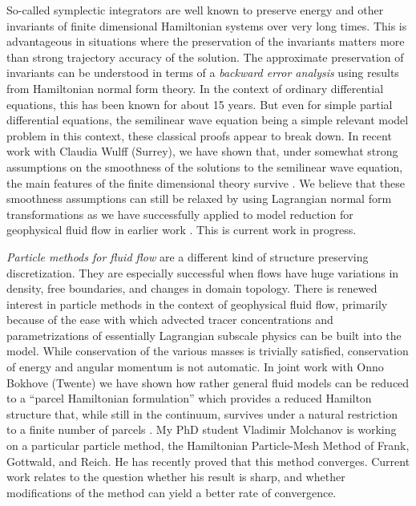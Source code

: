 So-called symplectic integrators are well known to preserve energy and
other invariants of finite dimensional Hamiltonian systems over very
long times.  This is advantageous in situations where the preservation
of the invariants matters more than strong trajectory accuracy of the
solution.  The approximate preservation of invariants can be
understood in terms of a \emph{backward error analysis} using results
from Hamiltonian normal form theory.  In the context of ordinary
differential equations, this has been known for about 15 years.  But
even for simple partial differential equations, the semilinear wave
equation being a simple relevant model problem in this context, these
classical proofs appear to break down.  In recent work with Claudia
Wulff (Surrey), we have shown that, under somewhat strong assumptions
on the smoothness of the solutions to the semilinear wave equation,
the main features of the finite dimensional theory survive
\cite{OliverWulff}.  We believe that these smoothness assumptions can
still be relaxed by using Lagrangian normal form transformations as we
have successfully applied to model reduction for geophysical fluid flow
in earlier work \cite{Oliver}.  This is current work in progress.

\emph{Particle methods for fluid flow} are a different kind of
structure preserving discretization.  They are especially successful
when flows have huge variations in density, free boundaries, and
changes in domain topology.  There is renewed interest in particle
methods in the context of geophysical fluid flow, primarily because of
the ease with which advected tracer concentrations and
parametrizations of essentially Lagrangian subscale physics can be
built into the model.  While conservation of the various masses is
trivially satisfied, conservation of energy and angular momentum is
not automatic.  In joint work with Onno Bokhove (Twente) we have shown
how rather general fluid models can be reduced to a ``parcel
Hamiltonian formulation'' which provides a reduced Hamilton structure
that, while still in the continuum, survives under a natural
restriction to a finite number of parcels
\cite{BokhoveOliver,BokhoveOliver2}.  My PhD student Vladimir
Molchanov is working on a particular particle method, the Hamiltonian
Particle-Mesh Method of Frank, Gottwald, and Reich.  He has recently
proved that this method converges.  Current work relates to the
question whether his result is sharp, and whether modifications of the
method can yield a better rate of convergence.


